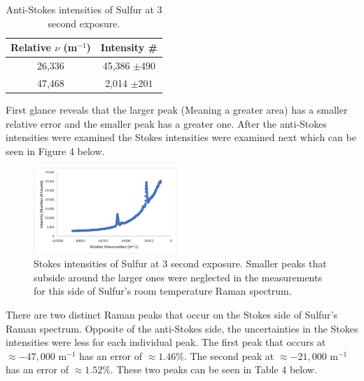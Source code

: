 \documentclass[twocolumn]{article}
\begin{document}
\begin{table}[htp]
\begin{center}
\begin{tabular}{|c|c|}
    \hline \textbf{Relative $\nu$ (m$^{-1}$)} & \textbf{Intensity \#} \\ \hline
    26,336 & 45,386 $\pm 490$ \\ \hline
    47,468 & 2,014 $\pm 201$ \\ \hline
\end{tabular}
\caption{Anti-Stokes intensities of Sulfur at 3 second exposure.}
\end{center}
\label{default}
\end{table}%
\newline
First glance reveals that the larger peak (Meaning a greater area) has a smaller relative error and the smaller peak has a greater one. After the anti-Stokes intensities were examined the Stokes intensities were examined next which can be seen in Figure 4 below.
\begin{figure}[htbp]
\begin{center}
\includegraphics[width=0.48\textwidth]{Figures/PHYS 331 RS S Stokes Relative Wavenumber.png}
\caption{Stokes intensities of Sulfur at 3 second exposure. Smaller peaks that subside around the larger ones were neglected in the measurements for this side of 
Sulfur's room temperature Raman spectrum.}
\label{default}
\end{center}
\end{figure}
\newline
There are two distinct Raman peaks that occur on the Stokes side of Sulfur's Raman spectrum. Opposite of the anti-Stokes side, the uncertainties in the Stokes intensities were less for each individual peak. The first peak that occurs at $\approx -47,000$ m$^{-1}$ has an error of $\approx 1.46\%$. The second peak at $\approx -21,000$ m$^{-1}$ has an error of $\approx 1.52\%$. These two peaks can be seen in Table 4 below.
\end{document}
